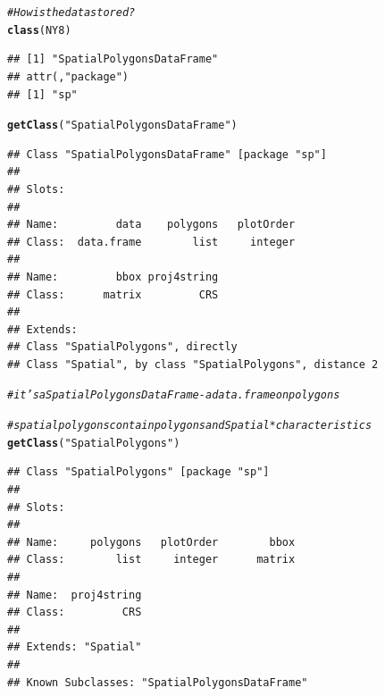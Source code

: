 \documentclass{article}\usepackage[]{graphicx}\usepackage[]{color}
\makeatletter
\newcommand{\hlstr}[1]{\textcolor[rgb]{0.192,0.494,0.8}{#1}}%
\newcommand{\hlcom}[1]{\textcolor[rgb]{0.678,0.584,0.686}{\textit{#1}}}%
\newcommand{\hlstd}[1]{\textcolor[rgb]{0.345,0.345,0.345}{#1}}%
\newcommand{\hlkwd}[1]{\textcolor[rgb]{0.737,0.353,0.396}{\textbf{#1}}}%
\newenvironment{kframe}{%
 \def\at@end@of@kframe{}%
 \ifinner\ifhmode%
  \def\at@end@of@kframe{\end{minipage}}%
  \begin{minipage}{\columnwidth}%
 \fi\fi%
 \def\FrameCommand##1{\hskip\@totalleftmargin \hskip-\fboxsep
 \colorbox{shadecolor}{##1}\hskip-\fboxsep
     \hskip-\linewidth \hskip-\@totalleftmargin \hskip\columnwidth}%
 \MakeFramed {\advance\hsize-\width
   \@totalleftmargin\z@ \linewidth\hsize
   \@setminipage}}%
 {\par\unskip\endMakeFramed%
 \at@end@of@kframe}
\newenvironment{knitrout}{}{} %
\makeatother
\begin{document}
\begin{knitrout}
\color{fgcolor}\begin{kframe}
\begin{alltt}
\hlcom{# How is the data stored?}
\hlkwd{class}\hlstd{(NY8)}
\end{alltt}
\begin{verbatim}
## [1] "SpatialPolygonsDataFrame"
## attr(,"package")
## [1] "sp"
\end{verbatim}
\begin{alltt}
\hlkwd{getClass}\hlstd{(}\hlstr{"SpatialPolygonsDataFrame"}\hlstd{)}
\end{alltt}
\begin{verbatim}
## Class "SpatialPolygonsDataFrame" [package "sp"]
## 
## Slots:
##                                           
## Name:         data    polygons   plotOrder
## Class:  data.frame        list     integer
##                               
## Name:         bbox proj4string
## Class:      matrix         CRS
## 
## Extends: 
## Class "SpatialPolygons", directly
## Class "Spatial", by class "SpatialPolygons", distance 2
\end{verbatim}
\begin{alltt}
\hlcom{#it's a SpatialPolygonsDataFrame - a data.frame on polygons}

\hlcom{#spatial polygons contain polygons and Spatial* characteristics}
\hlkwd{getClass}\hlstd{(}\hlstr{"SpatialPolygons"}\hlstd{)}
\end{alltt}
\begin{verbatim}
## Class "SpatialPolygons" [package "sp"]
## 
## Slots:
##                                           
## Name:     polygons   plotOrder        bbox
## Class:        list     integer      matrix
##                   
## Name:  proj4string
## Class:         CRS
## 
## Extends: "Spatial"
## 
## Known Subclasses: "SpatialPolygonsDataFrame"
\end{verbatim}
\end{kframe}
\end{knitrout}
\end{document}
